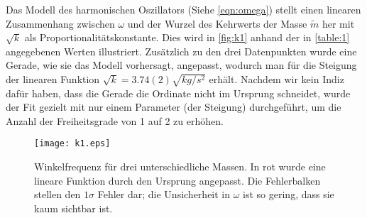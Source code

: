 Das Modell des harmonischen Oszillators (Siehe \autoref{eqn:omega}) stellt einen linearen Zusammenhang zwischen \( \omega \) und der Wurzel des Kehrwerts der Masse \( \tilde{m} \) her mit\( \sqrt{k} \) als Proportionalitätskonstante. Dies wird in \autoref{fig:k1} anhand der in \autoref{table:1} angegebenen Werten illustriert. Zusätzlich zu den drei Datenpunkten wurde eine Gerade, wie sie das Modell vorhersagt, angepasst, wodurch man für die Steigung der linearen Funktion \( \sqrt{k} = 3.74(2) \unit{\sqrt{kg / s^2}} \) erhält. Nachdem wir kein Indiz dafür haben, dass die Gerade die Ordinate nicht im Ursprung schneidet, wurde der Fit gezielt mit nur einem Parameter (der Steigung) durchgeführt, um die Anzahl der Freiheitsgrade von 1 auf 2 zu erhöhen. 

\begin{figure}[H]
	\centering
	\texttt{[image: k1.eps]}
	\caption[Zusammenhang zwischen \( \omega \) und \( \tilde{m} \)]{Winkelfrequenz für drei unterschiedliche Massen. In rot wurde eine lineare Funktion durch den Ursprung angepasst. Die Fehlerbalken stellen den $1\sigma$ Fehler dar; die Unsicherheit in \( \omega \) ist so gering, dass sie kaum sichtbar ist.}
	\label{fig:k1}
\end{figure}